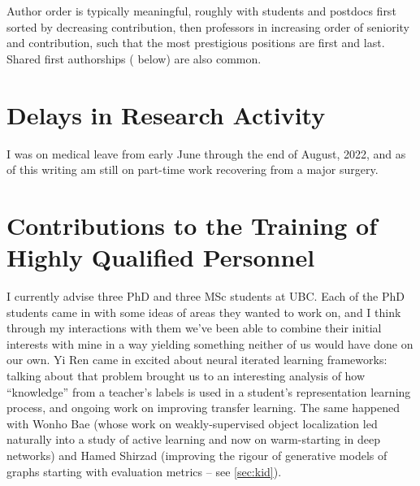 \documentclass[12pt]{article}
\newcommand{\bibeqcon}{{\footnotemark[1]}}
\begin{document}
Author order is typically meaningful,
roughly with students and postdocs first sorted by decreasing contribution,
then professors in increasing order of seniority and contribution,
such that the most prestigious positions are first and last.
Shared first authorships (\bibeqcon{} below) are also common.
{%

{%
\printbibliography[category=sec{{ loop.index }},title={ {{- sec_name -}} },heading=subbibnumbered]{}
{%

{%

\section{Delays in Research Activity}
I was on medical leave from early June through the end of August, 2022,
and as of this writing am still on part-time work recovering from a major surgery.

\section{Contributions to the Training of Highly Qualified Personnel}
I currently advise three PhD and three MSc students at UBC.
%
Each of the PhD students came in with some ideas of areas they wanted to work on,
and I think through my interactions with them we've been able to combine their initial interests with mine in a way yielding something neither of us would have done on our own.
Yi Ren came in excited about neural iterated learning frameworks:
talking about that problem brought us to an interesting analysis of how ``knowledge'' from a teacher's labels is used in a student's representation learning process,
and ongoing work on improving transfer learning.
The same happened with Wonho Bae
(whose work on weakly-supervised object localization led naturally into a study of active learning and now on warm-starting in deep networks)
and Hamed Shirzad (improving the rigour of generative models of graphs starting with evaluation metrics -- see \cref{sec:kid}).

}}}}
\end{document}

